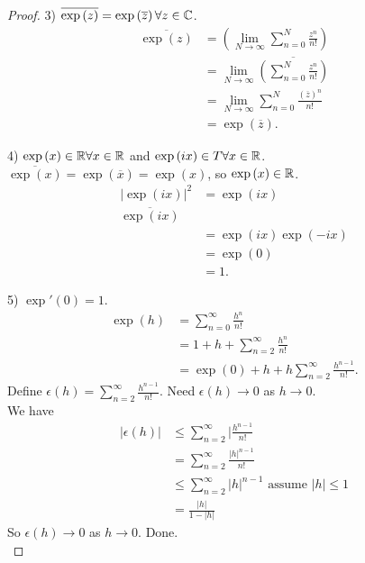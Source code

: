 \documentclass[a4paper]{article}
\begin{document}
\begin{thm}
\begin{proof}
3) $\overline{\exp\left(z\right)}=\exp\left(\overline{z}\right) \forall z\in \mathbb{C}$.\\
\begin{equation*}
\begin{aligned}
\overline{\exp\left(z\right)}&=\left(\lim_{N\to\infty} \sum_{n=0}^N \frac{z^n}{n!}\right)\\
&=\lim_{N\to\infty} \overline{\left(\sum_{n=0}^N \frac{z^n}{n!}\right)}\\
&=\lim_{N\to\infty} \sum_{n=0}^N \frac{\left(\overline{z}\right)^n}{n!}\\
&=\exp\left(\overline{z}\right).
\end{aligned}
\end{equation*}

4) $\exp\left(x\right)\in\mathbb{R} \forall x\in\mathbb{R}$ and $\exp\left(ix\right)\in T \forall x\in\mathbb{R}$.\\
$\overline{\exp\left(x\right)} = \exp\left(\overline{x}\right)=\exp\left(x\right)$, so $\exp\left(x\right)\in\mathbb{R}$.\\
\begin{equation*}
\begin{aligned}
|\exp\left(ix\right)|^2 &= \exp\left(ix\right)\\
\overline{\exp\left(ix\right)}\\
&=\exp\left(ix\right)\exp\left(-ix\right)\\
&=\exp\left(0\right)\\
&=1.
\end{aligned}
\end{equation*}

5) $\exp'\left(0\right)=1$.\\
\begin{equation*}
\begin{aligned}
\exp\left(h\right)&=\sum_{n=0}^\infty \frac{h^n}{n!}\\
&= 1+h+\sum_{n=2}^\infty \frac{h^n}{n!}\\
&= \exp\left(0\right)+h+h\sum_{n=2}^\infty \frac{h^{n-1}}{n!}.
\end{aligned}
\end{equation*}
Define $\epsilon\left(h\right) = \sum_{n=2}^\infty \frac{h^{n-1}}{n!}$. Need $\epsilon\left(h\right)\to 0$ as $h\to 0$.\\
We have
\begin{equation*}
\begin{aligned}
|\epsilon\left(h\right)|&\leq \sum_{n=2}^\infty |\frac{h^{n-1}}{n!}\\
&= \sum_{n=2}^\infty \frac{|h|^{n-1}}{n!}\\
&\leq \sum_{n=2}^\infty |h|^{n-1} \text{  assume }|h| \leq 1\\
&=\frac{|h|}{1-|h|}
\end{aligned}
\end{equation*}
So $\epsilon\left(h\right)\to 0$ as $h\to 0$. Done.\\


\end{proof}
\end{thm}
\end{document}
